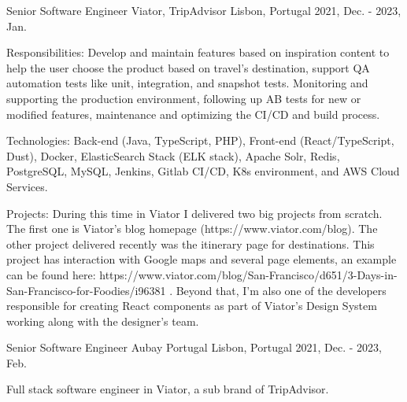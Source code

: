 \begin{cventries}
  \cventry
    {Senior Software Engineer} %
    {Viator, TripAdvisor} %
    {Lisbon, Portugal} %
    {2021, Dec. - 2023, Jan.} %
    {
      \begin{cvitems} %
        \item {Responsibilities: Develop and maintain features based on inspiration content to help the user choose the product based on travel’s destination, support QA automation tests like unit, integration, and snapshot tests. Monitoring and supporting the production environment, following up AB tests for new or modified features, maintenance and optimizing the CI/CD and build process.}
        \item {Technologies: Back-end (Java, TypeScript, PHP), Front-end (React/TypeScript, Dust), Docker, ElasticSearch Stack (ELK stack), Apache Solr, Redis, PostgreSQL, MySQL, Jenkins, Gitlab CI/CD, K8s environment, and AWS Cloud Services.}
        \item {Projects: During this time in Viator I delivered two big projects from scratch. The first one is Viator’s blog homepage (https://www.viator.com/blog). The other project delivered recently was the itinerary page for destinations. This project has interaction with Google maps and several page elements, an example can be found here: https://www.viator.com/blog/San-Francisco/d651/3-Days-in-San-Francisco-for-Foodies/i96381 . Beyond that, I’m also one of the developers responsible for creating React components as part of Viator’s Design System working along with the designer’s team.}
      \end{cvitems}
    }

  \cventry
    {Senior Software Engineer} %
    {Aubay Portugal} %
    {Lisbon, Portugal} %
    {2021, Dec. - 2023, Feb.} %
    {
      \begin{cvitems} %
        \item {Full stack software engineer in Viator, a sub brand of TripAdvisor.}
      \end{cvitems}
    }


\end{cventries}
